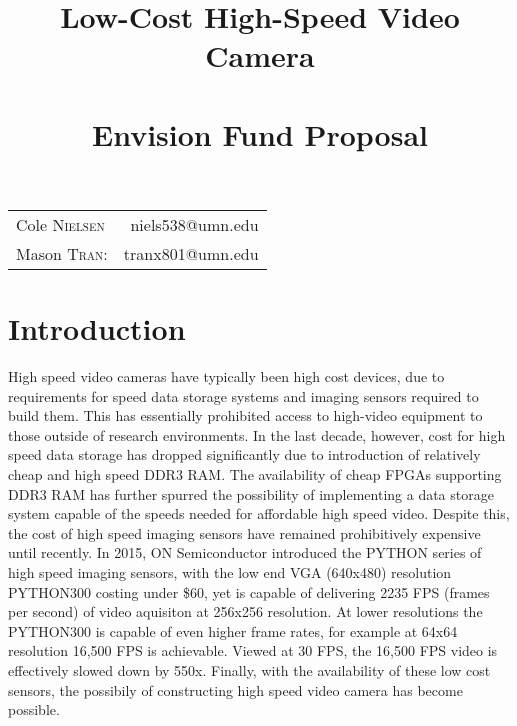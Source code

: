 \documentclass[12pt]{article}
\title{\LARGE Low-Cost High-Speed Video Camera\\\adforn{21}\\Envision Fund Proposal}
\date{}
\begin{document}
\maketitle 
\begin{center}
 \begin{tabular}{l r}
   Cole \textsc{Nielsen} & niels538@umn.edu\\ 
   Mason \textsc{Tran}: & tranx801@umn.edu\\ 
\end{tabular}
\end{center}
\pagebreak

\section{Introduction}
High speed video cameras have typically been high cost devices, due to requirements for speed data storage systems and imaging sensors required to build them. This has essentially prohibited access to high-video equipment to those outside of research environments. In the last decade, however, cost for high speed data storage has dropped significantly due to introduction of relatively cheap and high speed DDR3 RAM. The availability of cheap FPGAs supporting DDR3 RAM has further spurred the possibility of implementing a data storage system capable of the speeds needed for affordable high speed video. Despite this, the cost of high speed imaging sensors have remained prohibitively expensive until recently. In 2015, ON Semiconductor introduced the PYTHON series of high speed imaging sensors, with the low end VGA (640x480) resolution PYTHON300 costing under \$60, yet is capable of delivering 2235 FPS (frames per second) of video aquisiton at 256x256 resolution. At lower resolutions the PYTHON300 is capable of even higher frame rates, for example at 64x64 resolution 16,500 FPS is achievable. Viewed at 30 FPS, the 16,500 FPS video is effectively slowed down by 550x. Finally, with the availability of these low cost sensors, the possibily of constructing high speed video camera has become possible. \\\par
\end{document}
